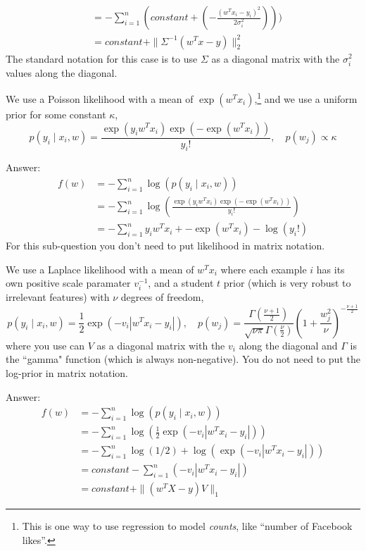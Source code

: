 \documentclass{article}
\def\ans#1{\par\gre{Answer: #1}}
\def\gre#1{{\color{gre}#1}}
\def\cond{\; | \;}
\begin{document}
{{\begin{align*}
        & = -\sum_{i=1}^n (constant + \left(-\frac{(w^Tx_i - y_i)^2}{2\sigma_i^2}\right))) \\
        & = constant + \|{\Sigma^{-1}(w^Tx - y)}\|_2^2
    \end{align*}
}
The standard notation for this case is to use $\Sigma$ as a diagonal matrix with the $\sigma_i^2$ values along the diagonal.
\item We use a Poisson likelihood with a mean of $\exp(w^Tx_i)$,\footnote{This is one way to use regression to model \emph{counts}, like ``number of Facebook likes''.} and we use a uniform prior for some constant $\kappa$,
\[
p(y_i \cond x_i, w) = \frac{\exp(y_iw^Tx_i)\exp(-\exp(w^Tx_i))}{y_i!}, \quad p(w_j) \propto \kappa
\]
\ans{
\begin{align*}
    f(w) &= -\sum_{i=1}^n \log(p(y_i \cond x_i, w))\\
    & = -\sum_{i=1}^n \log(\frac{\exp(y_iw^Tx_i)\exp(-\exp(w^Tx_i))}{y_i!})\\
    & = -\sum_{i=1}^n y_iw^Tx_i + -\exp(w^Tx_i) - \log(y_i!)
\end{align*}
}
For this sub-question you don't need to put likelihood in matrix notation.
\item We use a Laplace likelihood with a mean of $w^Tx_i$ where each example $i$ has its own positive scale paramater $v_i^{-1}$, and a  student $t$ prior (which is very robust to irrelevant features) with $\nu$ degrees of freedom,
\[
p(y_i \cond x_i, w) = \frac 1 2 \exp\left(-v_i|w^Tx_i - y_i|\right), \quad  p(w_j) = \frac{\Gamma\left(\frac{\nu + 1}{2}\right)}{\sqrt{\nu\pi}\Gamma\left(\frac \nu 2\right)}\left(1 + \frac{w_j^2}{\nu}\right)^{-\frac{\nu+1}{2}}
\]
where you use can $V$ as a diagonal matrix with the $v_i$ along the diagonal and $\Gamma$ is the ``gamma" function (which is always non-negative). You do not need to put the log-prior in matrix notation.
\ans{
    \begin{align*}
        f(w) &= -\sum_{i=1}^n \log(p(y_i \cond x_i, w))\\
        & = -\sum_{i=1}^n \log(\frac 1 2 \exp\left(-v_i|w^Tx_i - y_i|\right))\\
        & = -\sum_{i=1}^n \log(1/2) + \log(\exp\left(-v_i|w^Tx_i - y_i|\right)) \\
        & = constant -\sum_{i=1}^n \left(-v_i|w^Tx_i - y_i|\right)\\
        &= constant + \|(w^TX -y)V\|_1
    \end{align*}
}
}
\end{document}
